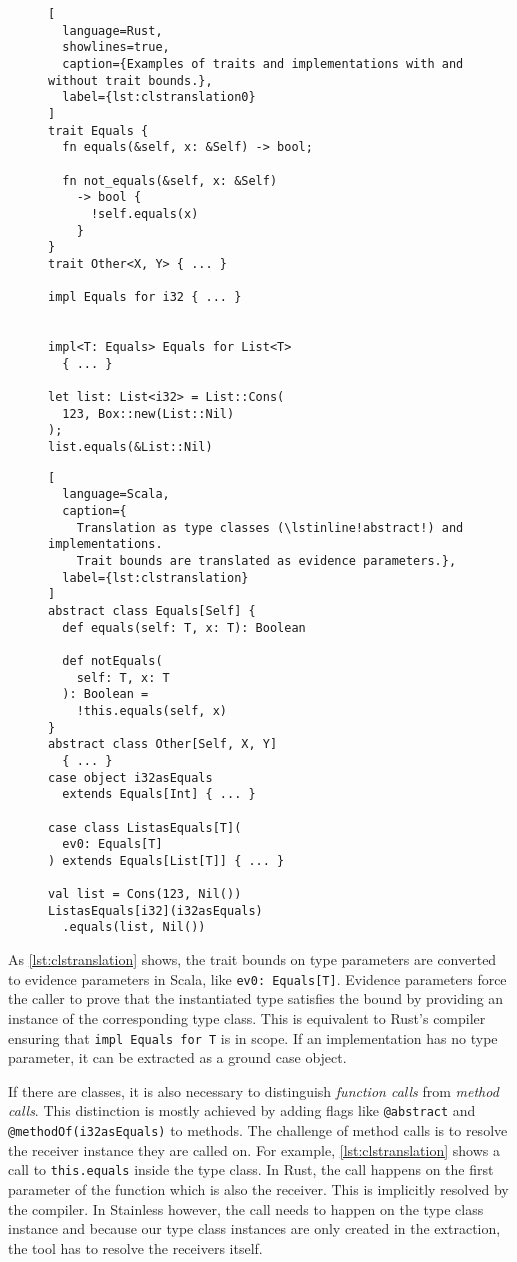\begin{figure}
\begin{minipage}[t]{.49\textwidth}
\begin{lstlisting}[
  language=Rust,
  showlines=true,
  caption={Examples of traits and implementations with and without trait bounds.},
  label={lst:clstranslation0}
]
trait Equals {
  fn equals(&self, x: &Self) -> bool;

  fn not_equals(&self, x: &Self)
    -> bool {
      !self.equals(x)
    }
}
trait Other<X, Y> { ... }

impl Equals for i32 { ... }


impl<T: Equals> Equals for List<T>
  { ... }

let list: List<i32> = List::Cons(
  123, Box::new(List::Nil)
);
list.equals(&List::Nil)
\end{lstlisting}
\end{minipage}\hfill
\begin{minipage}[t]{.49\textwidth}
\begin{lstlisting}[
  language=Scala,
  caption={
    Translation as type classes (\lstinline!abstract!) and implementations.
    Trait bounds are translated as evidence parameters.},
  label={lst:clstranslation}
]
abstract class Equals[Self] {
  def equals(self: T, x: T): Boolean

  def notEquals(
    self: T, x: T
  ): Boolean =
    !this.equals(self, x)
}
abstract class Other[Self, X, Y]
  { ... }
case object i32asEquals
  extends Equals[Int] { ... }

case class ListasEquals[T](
  ev0: Equals[T]
) extends Equals[List[T]] { ... }

val list = Cons(123, Nil())
ListasEquals[i32](i32asEquals)
  .equals(list, Nil())
\end{lstlisting}
\end{minipage}
\end{figure}

As \autoref{lst:clstranslation} shows, the trait bounds on type parameters are
converted to evidence parameters in Scala, like \passthrough{\lstinline!ev0:
Equals[T]!}. Evidence parameters force the caller to prove that the instantiated
type satisfies the bound by providing an instance of the corresponding type
class. This is equivalent to Rust's compiler ensuring that
\passthrough{\lstinline!impl Equals for T!} is in scope. If an implementation
has no type parameter, it can be extracted as a ground case object.

If there are classes, it is also necessary to distinguish \emph{function calls}
from \emph{method calls}. This distinction is mostly achieved by adding flags
like \passthrough{\lstinline!@abstract!} and
\passthrough{\lstinline!@methodOf(i32asEquals)!} to methods. The challenge of
method calls is to resolve the receiver instance they are called on. For
example, \autoref{lst:clstranslation} shows a call to \lstinline!this.equals!
inside the type class. In Rust, the call happens on the first parameter of the
function which is also the receiver. This is implicitly resolved by the
compiler. In Stainless however, the call needs to happen on the type class
instance and because our type class instances are only created in the
extraction, the tool has to resolve the receivers itself.

